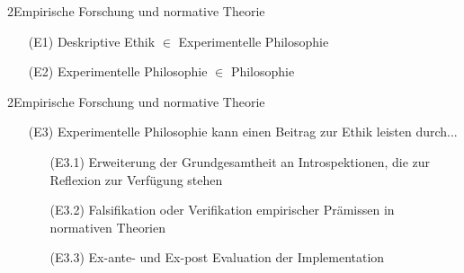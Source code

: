 \documentclass[xcolor=table,9pt,aspectratio=169]{beamer}
\begin{document}
\begin{frame}{\vspace*{10mm}2\hspace*{1em}Empirische Forschung und normative Theorie}
\begin{itemize}
   \item[(E1)] Deskriptive Ethik $\in$ Experimentelle Philosophie
   \item[(E2)] Experimentelle Philosophie $\in$ Philosophie
\end{itemize}
\end{frame}


\begin{frame}{\vspace*{10mm}2\hspace*{1em}Empirische Forschung und normative Theorie}
\begin{multicols}{2}
\begin{itemize}
   \item[(E3)] Experimentelle Philosophie kann einen Beitrag zur Ethik leisten durch...
   \begin{itemize}
      \item[(E3.1)] Erweiterung der Grundgesamtheit an Introspektionen, die zur Reflexion zur Verfügung stehen
      \item[(E3.2)] Falsifikation oder Verifikation empirischer Pr\"amissen in normativen Theorien
      \item[(E3.3)] Ex-ante- und Ex-post Evaluation der Implementation
   \end{itemize}
\end{itemize}
\vfill


\end{multicols}
\end{frame}
\end{document}
